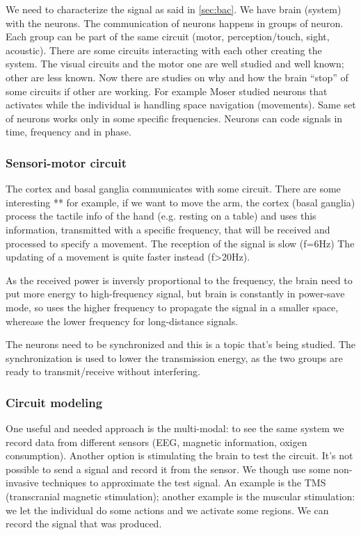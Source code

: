 We need to characterize the signal as said in \autoref{sec:bac}. We have brain (system) with the neurons. The communication of neurons happens in groups of neuron. Each group can be part of the same circuit (motor, perception/touch, sight, acoustic). There are some circuits interacting with each other creating the system. The visual circuits and the motor one are well studied and well known; other are less known. Now there are studies on why and how the brain ``stop'' of some circuits if other are working. For example Moser studied neurons that activates while the individual is handling space navigation (movements). Same set of neurons works only in some specific frequencies. Neurons can code signals in time, frequency and in phase.

\subsubsection{Sensori-motor circuit}
The cortex and basal ganglia communicates with some circuit. There are some interesting **
for example, if we want to move the arm, the cortex (basal ganglia) process the tactile info of the hand (e.g. resting on a table) and uses this information, transmitted with a specific frequency, that will be received and processed to specify a movement. The reception of the signal is slow (f=6Hz) The updating of a movement is quite faster instead (f>20Hz).

As the received power is inversly proportional to the frequency, the brain need to put more energy to high-frequency signal, but brain is constantly in power-save mode, so uses the higher frequency to propagate the signal in a smaller space, wherease the lower frequency for long-distance signals.

The neurons need to be synchronized and this is a topic that's being studied. The synchronization is used to lower the transmission energy, as the two groups are ready to transmit/receive without interfering.

\subsubsection{Circuit modeling}
One useful and needed approach is the multi-modal: to see the same system we record data from different sensors (EEG, magnetic information, oxigen consumption).
Another option is stimulating the brain to test the circuit. It's not possible to send a signal and record it from the sensor. We though use some non-invasive techniques to approximate the test signal. An example is the TMS (transcranial magnetic stimulation); another example is the muscular stimulation: we let the individual do some actions and we activate some regions. We can record the signal that was produced.

